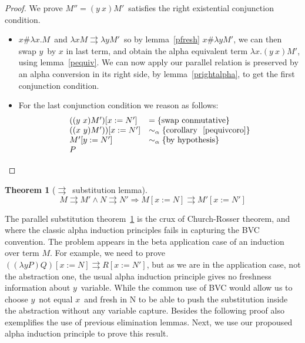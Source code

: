 \documentclass[preprint,10pt]{sigplanconf}
\newcommand{\lam}{\ensuremath{\lambda}}
\newcommand{\alpsym}{\ensuremath{\sim_\alpha}}
\newcommand{\p}{\ensuremath{\rightrightarrows}}
\newtheorem{theo}{Theorem}
\begin{document}
\begin{proof}
  We prove $M'' = (y\ x) M'$\ satisfies the right existential conjunction condition. 
  \begin{itemize}
  \item $x \# \lam x . M$\ and $\lam x M \p \lam y M'$\ so by lemma~\ref{pfresh} $x \# \lam y M'$, we can then swap $y$\ by $x$ in last term, and obtain the alpha equivalent term $\lam x . (y\ x) M'$, using lemma~\ref{pequiv}. We can now apply our parallel relation is preserved by an alpha conversion in its right side, by lemma~\ref{prightalpha}, to get the first conjunction condition.
  \item For the last conjunction condition we reason as follows:
    \[
    \begin{array}{ll}
     ((y\ x) M') [ x := N'] & = \text{\{swap conmutative\}} \\
     ((x\ y) M'))[ x := N'] & \alpsym {\text{\{corollary ~\ref{pequivcoro}\}}}\\
     M' [y := N']  & \alpsym \{{\text{by hypothesis}}\} \\
	P &
    \end{array}
    \]
  \end{itemize}
\end{proof}

\begin{theo}[\p\ substitution lemma]
\label{psubst}
\[ M \p M' \wedge N \p N'  \Rightarrow M [ x := N ] \p M' [ x := N' ] \]
\end{theo}

The parallel substitution theorem~\ref{psubst} is the crux of Church-Rosser theorem, and where the classic alpha induction principles fails in capturing the BVC convention. The problem appears in the beta application case of an induction over term $M$. For example, we need to prove $((\lam y P) Q) [x := N ] \p R [x := N']$, but as we are in the application case, not the abstraction one, the usual alpha induction principle gives no freshness information about $y$\ variable. While the common use of BVC would allow us to choose $y$\ not equal $x$\ and fresh in N to be able to push the substitution inside the abstraction without any variable capture. Besides the following proof also exemplifies the use of previous elimination lemmas. Next, we use our propoused alpha induction principle to prove this result.
\end{document}
